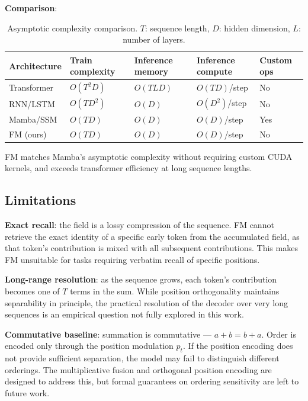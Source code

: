 \documentclass[11pt]{article}
\begin{document}
\textbf{Comparison}:

\begin{table}[h]
\centering
\begin{tabular}{@{}lllll@{}}
\toprule
Architecture & Train complexity & Inference memory & Inference compute & Custom ops \\
\midrule
Transformer  & $O(T^2 D)$    & $O(TLD)$   & $O(TD)$/step & No \\
RNN/LSTM     & $O(TD^2)$     & $O(D)$     & $O(D^2)$/step & No \\
Mamba/SSM    & $O(TD)$       & $O(D)$     & $O(D)$/step  & Yes \\
FM (ours)    & $O(TD)$       & $O(D)$     & $O(D)$/step  & No \\
\bottomrule
\end{tabular}
\caption{Asymptotic complexity comparison. $T$: sequence length, $D$: hidden dimension, $L$: number of layers.}
\end{table}

FM matches Mamba's asymptotic complexity without requiring custom CUDA kernels, and exceeds transformer efficiency at long sequence lengths.

\subsection{Limitations}

\textbf{Exact recall}: the field is a lossy compression of the sequence. FM cannot retrieve the exact identity of a specific early token from the accumulated field, as that token's contribution is mixed with all subsequent contributions. This makes FM unsuitable for tasks requiring verbatim recall of specific positions.

\textbf{Long-range resolution}: as the sequence grows, each token's contribution becomes one of $T$ terms in the sum. While position orthogonality maintains separability in principle, the practical resolution of the decoder over very long sequences is an empirical question not fully explored in this work.

\textbf{Commutative baseline}: summation is commutative — $a + b = b + a$. Order is encoded only through the position modulation $p_t$. If the position encoding does not provide sufficient separation, the model may fail to distinguish different orderings. The multiplicative fusion and orthogonal position encoding are designed to address this, but formal guarantees on ordering sensitivity are left to future work.
\end{document}
